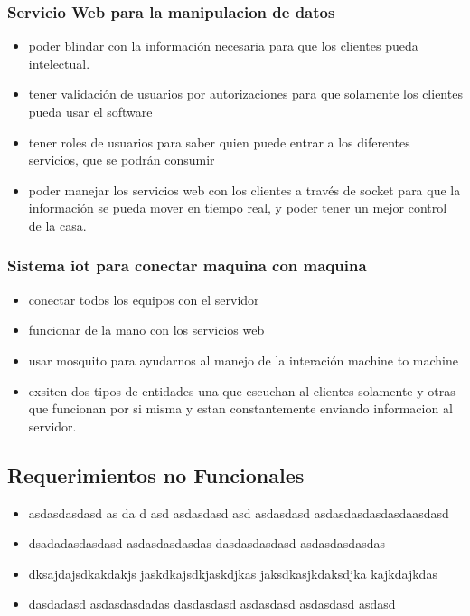 \subsubsection{Servicio Web para la manipulacion de datos}
\begin{itemize}
\item poder blindar con la información necesaria para que los clientes pueda intelectual.
\item tener validación de usuarios por autorizaciones para que solamente los clientes pueda usar el software
\item tener roles de usuarios para saber quien puede entrar a los diferentes servicios, que se podrán consumir
\item poder manejar los servicios web con los clientes a través de socket para que la información se pueda mover en tiempo real, y poder tener un mejor control de la casa.
\end{itemize}
\subsubsection{Sistema iot para conectar maquina con maquina}
\begin{itemize}
\item conectar todos los equipos con el servidor
\item funcionar de la mano con los servicios web
\item usar mosquito para ayudarnos al manejo de la interación machine to machine
\item exsiten dos tipos de entidades una que escuchan al clientes solamente y otras que funcionan por si misma y estan constantemente enviando informacion al servidor.
\end{itemize}

\subsection{Requerimientos no Funcionales}
\begin{itemize}
\item asdasdasdasd as da d asd asdasdasd asd asdasdasd asdasdasdasdasdaasdasd
\item dsadadasdasdasd asdasdasdasdas dasdasdasdasd asdasdasdasdas
\item dksajdajsdkakdakjs jaskdkajsdkjaskdjkas jaksdkasjkdaksdjka kajkdajkdas
\item dasdadasd asdasdasdadas dasdasdasd asdasdasd asdasdasd asdasd
\end{itemize}